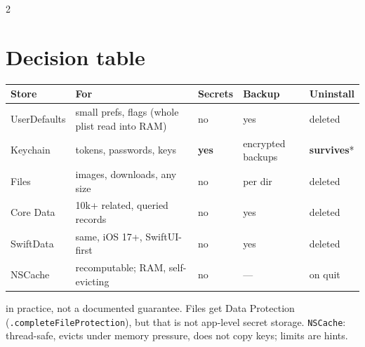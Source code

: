 \documentclass[8pt]{extarticle}
\begin{document}
\begin{multicols}{2}
\raggedright

\section{Decision table}
{\footnotesize\setlength{\tabcolsep}{3pt}
\begin{tabular}{@{}>{\raggedright\arraybackslash}p{15mm}>{\raggedright\arraybackslash}p{29mm}>{\raggedright\arraybackslash}p{9mm}>{\raggedright\arraybackslash}p{10mm}>{\raggedright\arraybackslash}p{11mm}@{}}
\toprule
\textbf{Store} & \textbf{For} & \textbf{Secrets} & \textbf{Backup} & \textbf{Uninstall} \\
\midrule
UserDefaults & small prefs, flags (whole plist read into RAM) & no & yes & deleted \\
Keychain & tokens, passwords, keys & \textbf{yes} & encrypted backups & \textbf{survives}* \\
Files & images, downloads, any size & no & per dir & deleted \\
Core Data & 10k+ related, queried records & no & yes & deleted \\
SwiftData & same, iOS 17+, SwiftUI-first & no & yes & deleted \\
NSCache & recomputable; RAM, self-evicting & no & — & on quit \\
\bottomrule
\end{tabular}}
{\footnotesize *in practice, not a documented guarantee. Files get Data Protection
(\texttt{.completeFileProtection}), but that is not app-level secret storage.
\texttt{NSCache}: thread-safe, evicts under memory pressure, does not copy keys;
limits are hints.}


\end{multicols}
\end{document}
